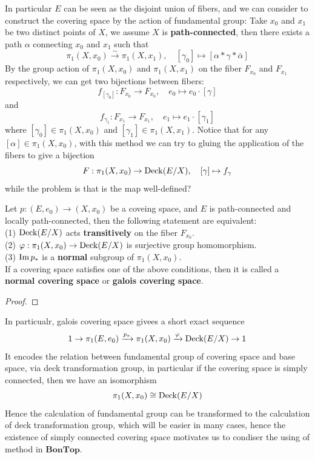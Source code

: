 \documentclass[12pt,a4paper]{article}
\begin{document}
In particular \(E\) can be seen as the disjoint union of fibers, and we can consider to construct the covering space by the action of fundamental group: Take \(x_0\) and \(x_1\) be two distinct points of \(X\), we assume \(X\) is \textbf{path-connected}, then there exists a path \(\alpha\) connecting \(x_0\) and \(x_1\) such that 
\[\pi_1(X,x_0) \xrightarrow{\sim} \pi_1(X,x_1), \quad [\gamma_0] \mapsto [\alpha * \gamma * \bar{\alpha}]\]
By the group action of \(\pi_1(X,x_0)\) and \(\pi_1(X,x_1)\) on the fiber \(F_{x_0}\) and \(F_{x_1}\) respectively, we can get two bijections between fibers:
\[f_{[\gamma_0]}: F_{x_0} \to F_{x_0}, \quad e_0 \mapsto e_0 \cdot [\gamma]\]
and
\[f_{\gamma_1}: F_{x_1} \to F_{x_1}, \quad e_1 \mapsto e_1 \cdot [\gamma_1]\]
where \([\gamma_0] \in \pi_1(X,x_0)\) and \([\gamma_1] \in \pi_1(X,x_1)\). Notice that for any \([\alpha] \in \pi_1(X,x_0)\), with this method we can try to gluing the application of the fibers to give a bijection
\[F: \pi_1(X,x_0) \to \operatorname{Deck}(E/X), \quad [\gamma] \mapsto f_{\gamma}\]
while the problem is that is the map well-defined?


\begin{lemma}
    Let \(p:(E,e_0) \to (X,x_0)\) be a coveing space, and \(E\) is path-connected and locally path-connected, then the following statement are equivalent:\\

    (1) \(\operatorname{Deck}(E/X)\) acts \textbf{transitively} on the fiber \(F_{x_0}\).\\

    (2) \(\varphi: \pi_1(X,x_0) \to \operatorname{Deck}(E/X)\) is surjective group homomorphism.\\

    (3) \(\operatorname{Im} p_*\) is a \textbf{normal} subgroup of \(\pi_1(X,x_0)\).\\

    If a covering space satisfies one of the above conditions, then it is called a \textbf{normal covering space} or \textbf{galois covering space}.
\end{lemma}
\begin{proof}
    
\end{proof}

\begin{remark}
    In particualr, galois covering space givees a short exact sequence
    \[1 \to \pi_1(E,e_0) \xrightarrow{p_*} \pi_1(X,x_0) \xrightarrow{\varphi} \operatorname{Deck}(E/X) \to 1\]
    It encodes the relation between fundamental group of covering space and base space, via deck transformation group, in particular if the covering space is simply connected, then we have an isomorphism
    \[\pi_1(X,x_0) \cong \operatorname{Deck}(E/X)\]
    Hence the calculation of fundamental group can be transformed to the calculation of deck transformation group, which will be easier in many cases, hence the existence of simply connected covering space motivates us to condiser the using of method in \(\mathbf{BonTop}\).


\end{remark}
\end{document}
